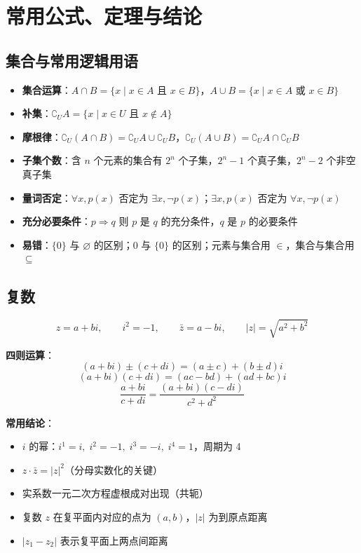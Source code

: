 \section{常用公式、定理与结论}

\subsection{集合与常用逻辑用语}

\begin{itemize}
  \item \textbf{集合运算}：$A \cap B = \{x \mid x \in A \text{ 且 } x \in B\}$，$A \cup B = \{x \mid x \in A \text{ 或 } x \in B\}$
  \item \textbf{补集}：$\complement_U A = \{x \mid x \in U \text{ 且 } x \notin A\}$
  \item \textbf{摩根律}：$\complement_U(A \cap B) = \complement_U A \cup \complement_U B$，$\complement_U(A \cup B) = \complement_U A \cap \complement_U B$
  \item \textbf{子集个数}：含 $n$ 个元素的集合有 $2^n$ 个子集，$2^n-1$ 个真子集，$2^n-2$ 个非空真子集
  \item \textbf{量词否定}：$\forall x, p(x)$ 否定为 $\exists x, \lnot p(x)$；$\exists x, p(x)$ 否定为 $\forall x, \lnot p(x)$
  \item \textbf{充分必要条件}：$p \Rightarrow q$ 则 $p$ 是 $q$ 的充分条件，$q$ 是 $p$ 的必要条件
  \item \textbf{易错}：$\{0\}$ 与 $\varnothing$ 的区别；$0$ 与 $\{0\}$ 的区别；元素与集合用 $\in$，集合与集合用 $\subseteq$
\end{itemize}

\subsection{复数}

\[
z = a + bi,\qquad i^2 = -1,\qquad \bar{z} = a - bi,\qquad |z| = \sqrt{a^2 + b^2}
\]

\textbf{四则运算}：
\[
(a+bi) \pm (c+di) = (a\pm c) + (b\pm d)i
\]
\[
(a+bi)(c+di) = (ac-bd) + (ad+bc)i
\]
\[
\frac{a+bi}{c+di} = \frac{(a+bi)(c-di)}{c^2+d^2}
\]

\textbf{常用结论}：
\begin{itemize}
  \item $i$ 的幂：$i^1 = i,\; i^2 = -1,\; i^3 = -i,\; i^4 = 1$，周期为 4
  \item $z \cdot \bar{z} = |z|^2$（分母实数化的关键）
  \item 实系数一元二次方程虚根成对出现（共轭）
  \item 复数 $z$ 在复平面内对应的点为 $(a,b)$，$|z|$ 为到原点距离
  \item $|z_1 - z_2|$ 表示复平面上两点间距离
\end{itemize}

